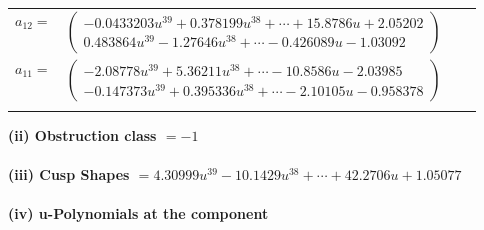 \documentclass[1p]{elsarticle_modified}
\theoremstyle{definition}
\begin{document}
\begin{tabular}{m{7pt} m{180pt} m{7pt} m{180pt} }
\flushright $a_{12}=$&$\begin{pmatrix}-0.0433203 u^{39}+0.378199 u^{38}+\cdots+15.8786 u+2.05202\\0.483864 u^{39}-1.27646 u^{38}+\cdots-0.426089 u-1.03092\end{pmatrix}$ \\
\flushright $a_{11}=$&$\begin{pmatrix}-2.08778 u^{39}+5.36211 u^{38}+\cdots-10.8586 u-2.03985\\-0.147373 u^{39}+0.395336 u^{38}+\cdots-2.10105 u-0.958378\end{pmatrix}$\\&\end{tabular}
\flushleft \textbf{(ii) Obstruction class $= -1$}\\~\\
\flushleft \textbf{(iii) Cusp Shapes $= 4.30999 u^{39}-10.1429 u^{38}+\cdots+42.2706 u+1.05077$}\\~\\
\newpage\renewcommand{\arraystretch}{1}
\flushleft \textbf{(iv) u-Polynomials at the component}\newline \\
\end{document}
